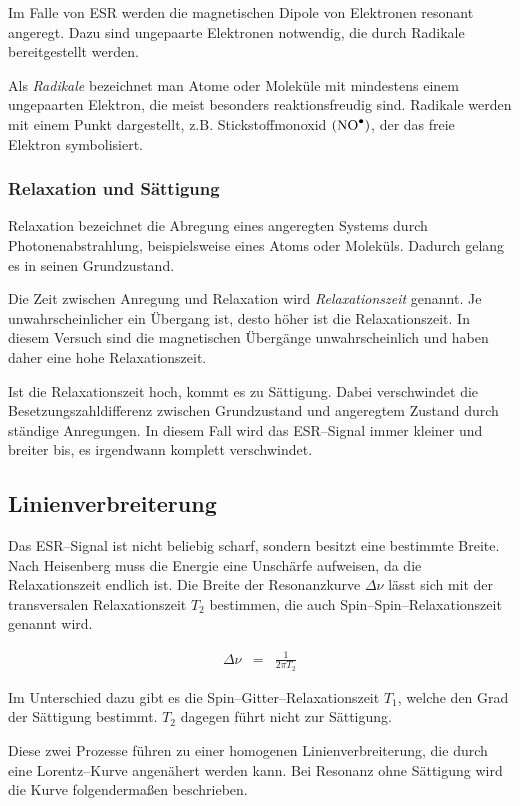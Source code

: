 \documentclass[12pt,a4paper]{scrartcl}
\numberwithin{equation}{section} %
\begin{document}
Im Falle von ESR werden die magnetischen Dipole von Elektronen resonant angeregt. Dazu sind ungepaarte Elektronen notwendig, die durch Radikale bereitgestellt werden.

Als \emph{Radikale} bezeichnet man Atome oder Moleküle mit mindestens einem ungepaarten Elektron, die meist besonders reaktionsfreudig sind. Radikale werden mit einem Punkt dargestellt, z.B. Stickstoffmonoxid $(\ce{NO^\bullet})$, der das freie Elektron symbolisiert. \cite{Radikale}

\subsubsection{Relaxation und Sättigung}
Relaxation bezeichnet die Abregung eines angeregten Systems durch Photonenabstrahlung, beispielsweise eines Atoms oder Moleküls. Dadurch gelang es in seinen Grundzustand.

Die Zeit zwischen Anregung und Relaxation wird \emph{Relaxationszeit} genannt. Je unwahrscheinlicher ein Übergang ist, desto höher ist die Relaxationszeit. In diesem Versuch sind die magnetischen Übergänge unwahrscheinlich und haben daher eine hohe Relaxationszeit.

Ist die Relaxationszeit hoch, kommt es zu Sättigung. Dabei verschwindet die Besetzungszahldifferenz zwischen Grundzustand und angeregtem Zustand durch ständige Anregungen. \cite{Oldenburg} In diesem Fall wird das ESR--Signal immer kleiner und breiter bis, es irgendwann komplett verschwindet.

\subsection{Linienverbreiterung}
Das ESR--Signal ist nicht beliebig scharf, sondern besitzt eine bestimmte Breite. Nach Heisenberg muss die Energie eine Unschärfe aufweisen, da die Relaxationszeit endlich ist. Die Breite der Resonanzkurve $\Delta \nu $ lässt sich mit der transversalen Relaxationszeit $T_2$ bestimmen, die auch Spin--Spin--Relaxationszeit genannt wird.

\begin{eqnarray}
	\Delta \nu &=& \frac{1}{2 \pi T_2}
\end{eqnarray}

\noindent
Im Unterschied dazu gibt es die Spin--Gitter--Relaxationszeit $T_1$, welche den Grad der Sättigung bestimmt. $T_2$ dagegen führt nicht zur Sättigung.

Diese zwei Prozesse führen zu einer homogenen Linienverbreiterung, die durch eine Lorentz--Kurve angenähert werden kann. Bei Resonanz ohne Sättigung wird die Kurve folgendermaßen beschrieben. \cite{Bern}
\end{document}
